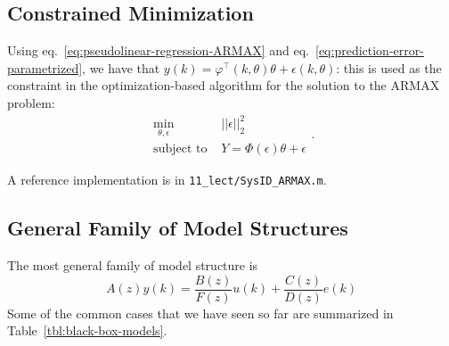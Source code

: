\subsection{Constrained Minimization}
\label{sec:ARMAX-minimization}

Using eq.~\eqref{eq:pseudolinear-regression-ARMAX} and eq.~\eqref{eq:prediction-error-parametrized}, we have that $y(k) = \varphi^\top(k,\theta) \theta + \epsilon(k,\theta)$: this is used as the constraint in the optimization-based algorithm for the solution to the ARMAX problem:
\begin{equation*}
  \begin{aligned}
    \min_{\theta,\epsilon}\ & ||\epsilon||_2^2 \\
    \textrm{subject to } & Y = \Phi(\epsilon)\theta + \epsilon
  \end{aligned}.
\end{equation*}

A reference implementation is in \texttt{11\_lect/SysID\_ARMAX.m}.

\subsection{General Family of Model Structures}
\label{sec:general-family-models}

The most general family of model structure is~\cite[Sect.~4]{ljung}
\begin{equation}
  \label{eq:general-family-models}
  A(z)y(k) = \frac{B(z)}{F(z)}u(k) + \frac{C(z)}{D(z)}e(k)
\end{equation}
Some of the common cases that we have seen so far are summarized in Table~\ref{tbl:black-box-models}.

